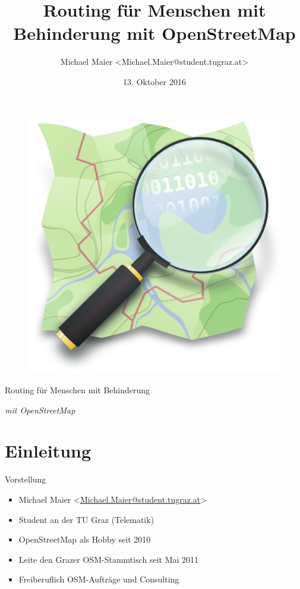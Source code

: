 \documentclass{beamer}
\title{Routing für Menschen mit Behinderung mit OpenStreetMap}
\author{Michael Maier \textless Michael.Maier@student.tugraz.at\textgreater}
\date{13. Oktober 2016}
\begin{document}

\begin{frame} 


\begin{figure}
  \centering
  \includegraphics[width=.4\textwidth]{mag_map.png}
\end{figure}

\begin{center}
\Huge{Routing für Menschen mit Behinderung\\}
\end{center}

\begin{center}
\Large{\emph{mit OpenStreetMap}}
\end{center}

\end{frame}


\section{Einleitung}

\begin{frame}{Vorstellung}

  \begin{itemize}
    \item Michael Maier \textless \href{mailto:Michael.Maier@student.tugraz.at}{Michael.Maier@student.tugraz.at}\textgreater
    \item Student an der TU Graz (Telematik)
\vspace{0.3cm}
    \item OpenStreetMap als Hobby seit 2010
    \item Leite den Grazer OSM-Stammtisch seit Mai 2011
\vspace{0.3cm}
    \item Freiberuflich OSM-Aufträge und Consulting
  \end{itemize}
\end{frame}
\end{document}
